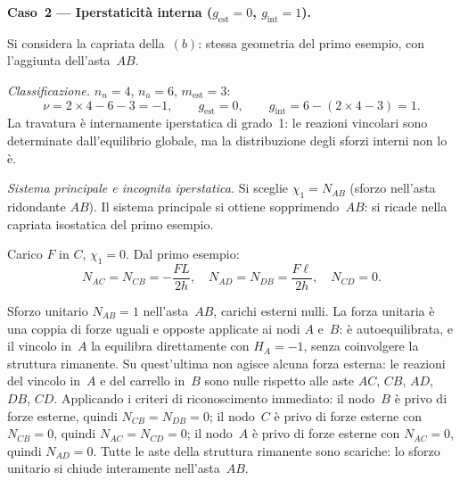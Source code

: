 \begin{esempio}
\begin{svolgimento}
		
		\noindent\textbf{Caso~2 --- Iperstaticità interna
			($g_\text{est} = 0$, $g_\text{int} = 1$).}
		
		Si considera la capriata della \,$(b)$:
		stessa geometria del primo esempio, con l'aggiunta
		dell'asta~$AB$.
		
		\smallskip
		\noindent\textit{Classificazione.}
		$n_n = 4$, $n_a = 6$, $m_\text{est} = 3$:
		\[
		\nu = 2 \times 4 - 6 - 3 = -1,
		\qquad
		g_\text{est} = 0,
		\qquad
		g_\text{int} = 6 - (2 \times 4 - 3) = 1.
		\]
		La travatura è internamente iperstatica di grado~1:
		le reazioni vincolari sono determinate dall'equilibrio
		globale, ma la distribuzione degli sforzi interni
		non lo è.
		
		\smallskip
		\noindent\textit{Sistema principale e incognita
			iperstatica.}
		Si sceglie $\chi_1 = N_{AB}$ (sforzo nell'asta
		ridondante $AB$). Il sistema principale si ottiene
		sopprimendo~$AB$: si ricade nella capriata
		isostatica del primo esempio.
		
		Carico $F$ in $C$, $\chi_1 = 0$.
		Dal primo esempio:
		\[
		N_{AC} = N_{CB} = -\frac{FL}{2h},
		\quad
		N_{AD} = N_{DB} = \frac{F\ell}{2h},
		\quad
		N_{CD} = 0.
		\]
		
		Sforzo unitario $N_{AB} = 1$ nell'asta~$AB$,
		carichi esterni nulli.
		La forza unitaria è una coppia di forze uguali
		e opposte applicate ai nodi $A$ e~$B$: è
		autoequilibrata, e il vincolo in~$A$ la equilibra
		direttamente con $H_A = -1$, senza coinvolgere
		la struttura rimanente.
		Su quest'ultima non agisce alcuna forza esterna:
		le reazioni del vincolo in~$A$ e del carrello
		in~$B$ sono nulle rispetto alle aste $AC$, $CB$,
		$AD$, $DB$, $CD$.
		Applicando i criteri di riconoscimento immediato:
		il nodo~$B$ è privo di forze esterne, quindi
		$N_{CB} = N_{DB} = 0$; il nodo~$C$ è privo di
		forze esterne con $N_{CB} = 0$, quindi
		$N_{AC} = N_{CD} = 0$; il nodo~$A$ è privo di
		forze esterne con $N_{AC} = 0$, quindi $N_{AD} = 0$.
		Tutte le aste della struttura rimanente sono
		scariche: lo sforzo unitario si chiude interamente
		nell'asta~$AB$.
	\end{svolgimento}
\end{esempio}


